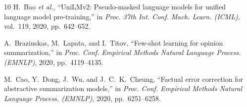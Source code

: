 \documentclass[conference]{IEEEtran}
\begin{document}
\begin{thebibliography}{10}
H.~Bao \textit{et al.}, ``UniLMv2: Pseudo-masked language models for unified language model pre-training,'' in \textit{Proc. 37th Int. Conf. Mach. Learn. (ICML)}, vol.~119, 2020, pp.~642--652.

A.~Brazinskas, M.~Lapata, and I.~Titov, ``Few-shot learning for opinion summarization,'' in \textit{Proc. Conf. Empirical Methods Natural Language Process. (EMNLP)}, 2020, pp.~4119--4135.

M.~Cao, Y.~Dong, J.~Wu, and J.~C.~K.~Cheung, ``Factual error correction for abstractive summarization models,'' in \textit{Proc. Conf. Empirical Methods Natural Language Process. (EMNLP)}, 2020, pp.~6251--6258.

\end{thebibliography}
\end{document}
